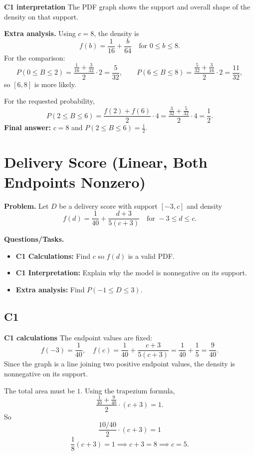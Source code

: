 \textbf{C1 interpretation}
The PDF graph shows the support and overall shape of the density on that support.

\textbf{Extra analysis.}
Using $c=8$, the density is
\[
f(b)=\frac{1}{16}+\frac{b}{64}\quad\text{for }0\le b\le 8.
\]
For the comparison:
\[
P(0\le B\le2)=\frac{\frac{1}{16}+\frac{3}{32}}{2}\cdot2=\frac{5}{32},\qquad
P(6\le B\le8)=\frac{\frac{5}{32}+\frac{3}{16}}{2}\cdot2=\frac{11}{32},
\]
so $[6,8]$ is more likely.

For the requested probability,
\[
P(2\le B\le6)=\frac{f(2)+f(6)}{2}\cdot4
=\frac{\frac{3}{32}+\frac{5}{32}}{2}\cdot4
=\frac12.
\]
\textbf{Final answer:} $c=8$ and $P(2\le B\le6)=\frac12$.

	\section{Delivery Score (Linear, Both Endpoints Nonzero)}
	
	\textbf{Problem.}
	Let $D$ be a delivery score with support $[-3,c]$ and density
	\[
	f(d)=\frac{1}{40}+\frac{d+3}{5(c+3)}\quad\text{for }-3\le d\le c.
	\]
	
	\textbf{Questions/Tasks.}
	\begin{itemize}
		\item \textbf{C1 Calculations:} Find $c$ so $f(d)$ is a valid PDF.
		\item \textbf{C1 Interpretation:} Explain why the model is nonnegative on its support.
		\item \textbf{Extra analysis:} Find $P(-1\le D\le 3)$.
	\end{itemize}
	
	\subsection*{C1}
	
	\textbf{C1 calculations}
	The endpoint values are fixed:
	\[
	f(-3)=\frac{1}{40},\quad f(c)=\frac{1}{40}+\frac{c+3}{5(c+3)}=\frac{1}{40}+\frac15=\frac{9}{40}.
	\]
	Since the graph is a line joining two positive endpoint values, the density is nonnegative on its support.
	
	The total area must be $1$. Using the trapezium formula,
	\[
	\frac{\frac{1}{40}+\frac{9}{40}}{2}\cdot(c+3)=1.
	\]
	So
	\[
	\frac{10/40}{2}\cdot(c+3)=1
	\]
	\[
	\frac{1}{8}(c+3)=1\implies c+3=8\implies c=5.
	\]
	
